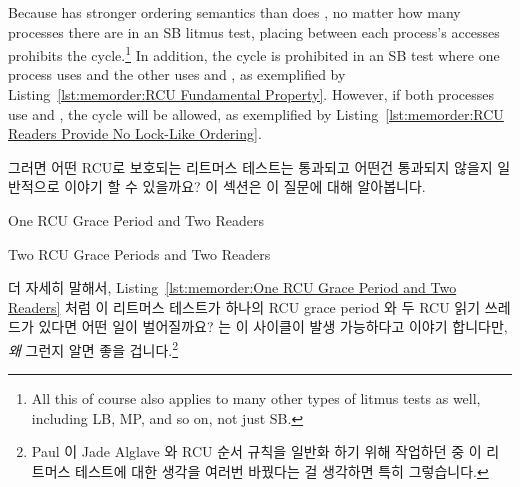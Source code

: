 Because  has stronger ordering semantics than does
, no matter how many processes there are in an SB
litmus test, placing  between each process's
accesses prohibits the cycle.\footnote{
	All this of course also applies to many other types of litmus tests
	as well, including LB, MP, and so on, not just SB.}
In addition, the cycle is prohibited in an SB test where one process
uses  and the other uses  and
, as exemplified by
Listing~\ref{lst:memorder:RCU Fundamental Property}.
However, if both processes use  and
, the cycle will be allowed, as exemplified by
Listing~\ref{lst:memorder:RCU Readers Provide No Lock-Like Ordering}.
\fi

그러면 어떤 RCU로 보호되는 리트머스 테스트는 통과되고 어떤건 통과되지 않을지
일반적으로 이야기 할 수 있을까요?
이 섹션은 이 질문에 대해 알아봅니다.

\begin{listing}[tb]

\caption{One RCU Grace Period and Two Readers}
\label{lst:memorder:One RCU Grace Period and Two Readers}
\end{listing}

\begin{listing}[tb]

\caption{Two RCU Grace Periods and Two Readers}
\label{lst:memorder:Two RCU Grace Periods and Two Readers}
\end{listing}

더 자세히 말해서,
Listing~\ref{lst:memorder:One RCU Grace Period and Two Readers} 처럼 이
리트머스 테스트가 하나의 RCU grace period 와 두 RCU 읽기 쓰레드가 있다면 어떤
일이 벌어질까요?
 는 이 사이클이 발생 가능하다고 이야기 합니다만, \emph{왜} 그런지 알면
좋을 겁니다.\footnote{
	Paul 이 Jade Alglave 와 RCU 순서 규칙을 일반화 하기 위해 작업하던 중 이
	리트머스 테스트에 대한 생각을 여러번 바꿨다는 걸 생각하면 특히
	그렇습니다.}

